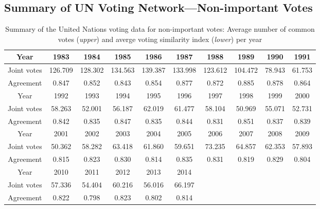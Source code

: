 \documentclass[a4paper]{article}
\begin{document}
\begin{appendices}
\section{Summary of UN Voting Network---Non-important Votes}\label{appendix: unimportantstat}
\begin{table}[ht]
	\centering
	\begin{tabular}{ |c|c|c|c|c|c|c|c|c|c|} 
		\hline
		{Year}	& 1983 & 1984& 1985& 1986 & 1987& 1988& 1989&1990&1991\\ \hline
		Joint votes & 126.709&128.302& 134.563& 139.387& 133.998& 123.612& 104.472&  78.943 & 61.753\\\hline
		Agreement & 0.847& 0.852&0.843& 0.854& 0.877&0.872& 0.885& 0.878&0.864\\\hline\hline 
		{Year}	& 1992&1993& 1994 & 1995& 1996& 1997 & 1998& 1999& 2000\\ \hline
		Joint votes  & 58.263&  52.001&  56.187& 62.019&  61.477&  58.104&  50.969&55.071 & 52.731\\\hline
		Agreement &0.842&0.835&0.847&0.835& 0.844& 0.831& 0.851&0.837& 0.839\\\hline\hline	
		{Year}	&2001&2002&2003&2004&2005& 2006& 2007& 2008&  2009\\ \hline
		Joint votes &  50.362& 58.282&  63.418&  61.860& 59.651& 73.235&64.857&62.353&  57.893\\\hline
		Agreement &0.815& 0.823&0.830& 0.814& 0.835& 0.831&0.819&0.829& 0.804\\
		\hline\hline	
		Year & 2010& 2011&2012&2013&2014&&&&\\\hline
		Joint votes& 57.336&  54.404& 60.216& 56.016&  66.197&&&&\\\hline
			Agreement&  0.822&0.798&0.823&0.802&0.814&&&&\\\hline
	\end{tabular}
	\caption {Summary of the United Nations voting data for non-important votes: Average number of common votes (\textit{upper}) and averge voting similarity index (\textit{lower}) per year}
	\label{table:unimportant}
\end{table}



\end{appendices}
\end{document}

